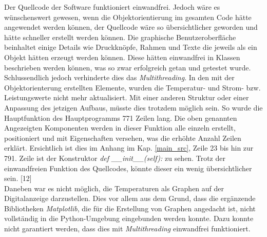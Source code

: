 

Der Quellcode der Software funktioniert einwandfrei. Jedoch wäre es wünschenswert gewesen, wenn die Objektorientierung im gesamten Code hätte angewendet werden können, der Quellcode wäre so übersichtlicher geworden und hätte schneller erstellt werden können. Die graphische Benutzeroberfläche beinhaltet einige Details wie Druckknöpfe, Rahmen und Texte die jeweils als ein Objekt hätten erzeugt werden können. Diese hätten einwandfrei in Klassen beschrieben werden können, was so zwar erfolgreich getan und getestet wurde. Schlussendlich jedoch verhinderte dies das \textit{Multithreading}. In den mit der Objektorienterung erstellten Elemente, wurden die Temperatur- und Strom- bzw. Leistungswerte nicht mehr aktualisiert. Mit einer anderen Struktur oder einer Anpassung des jetzigen Aufbaus, müsste dies trotzdem möglich sein. So wurde die Hauptfunktion des Hauptprogramms 771 Zeilen lang. Die oben genannten Angezeigten Komponenten werden in dieser Funktion alle einzeln erstellt, positioniert und mit Eigenschaften versehen, was die erhöhte Anzahl Zeilen erklärt. Ersichtlich ist dies im Anhang im Kap. \ref{main_src}, Zeile 23 bis hin zur 791. Zeile ist der Konstruktor \textit{def \_\_init\_\_(self):} zu sehen. Trotz der einwandfreien Funktion des Quellcodes, könnte dieser ein wenig übersichtlicher sein. [12]\\

Daneben war es nicht möglich, die Temperaturen als Graphen auf der Digitalanzeige darzustellen. Dies vor allem aus dem Grund, dass die ergänzende Bibliotheken \textit{Matplotlib}, die für die Erstellung von Graphen angedacht ist, nicht vollständig in die Python-Umgebung eingebunden werden konnte. Dazu konnte nicht garantiert werden, dass dies mit \textit{Multithreading} einwandfrei funktioniert.

